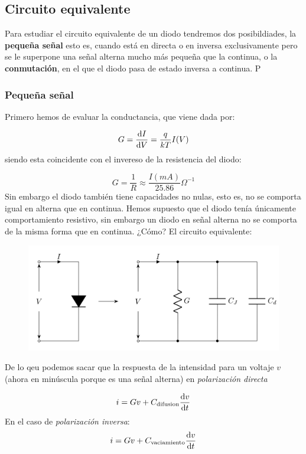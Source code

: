 \subsection{Circuito equivalente}

Para estudiar el circuito equivalente de un diodo tendremos dos posibildiades, la \textbf{pequeña señal} esto es, cuando está en directa o en inversa exclusivamente pero se le superpone una señal alterna mucho más pequeña que la continua, o la \textbf{conmutación}, en el que el diodo pasa de estado inversa a continua. P

\subsubsection{Pequeña señal}

Primero hemos de evaluar la conductancia, que viene dada por:

\begin{equation}
    G = \frac{\mathrm{d} I}{\mathrm{d} V} = \frac{q}{kT} I(V)
\end{equation}
siendo esta coincidente con el invereso de la resistencia del diodo:

\begin{equation}
    G = \frac{1}{R} \approx \frac{I(\unit{mA})}{25.86} \Omega^{-1}
\end{equation}
Sin embargo el diodo también tiene capacidades no nulas, esto es, no se comporta igual en alterna que en continua.
Hemos supuesto que el diodo tenía únicamente comportamiento resistivo, sin embargo un diodo en señal alterna no se comporta de la misma forma que en continua. ¿Cómo? El circuito equivalente: 

\begin{figure}[h!] \centering
    \includegraphics[width=0.6\linewidth]{Cuerpo/Ch_03/03_Temario_12}
\end{figure}
De lo qeu podemos sacar que la respuesta de la intensidad para un voltaje $v$  (ahora en minúscula porque es una señal alterna) en \textit{polarización directa}

\begin{equation}
    i = G v + C_{\text{difusion}} \frac{\mathrm{d} v}{\mathrm{d} t} 
\end{equation}
En el caso de \textit{polarización inversa}:
\begin{equation}
    i = G v + C_{\text{vaciamiento}} \frac{\mathrm{d} v}{\mathrm{d} t} 
\end{equation}

